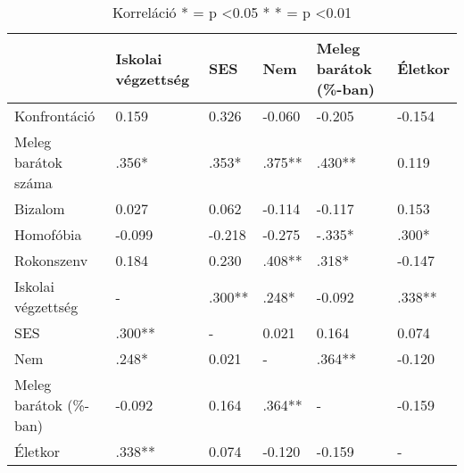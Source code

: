 \begin{table}[h]
	\begin{tabular}{@{}lp{2cm}p{2cm}lp{2cm}l@{}}
		\toprule
		& Iskolai végzettség & SES & Nem    & Meleg barátok (\%-ban) & Életkor \\ \midrule
		Konfrontáció            & 0.159              & 0.326                   & -0.060 & -0.205                 & -0.154  \\
		Meleg barátok száma     & .356*              & .353*                   & .375** & .430**                 & 0.119   \\
		Bizalom                 & 0.027              & 0.062                   & -0.114 & -0.117                 & 0.153   \\
		Homofóbia               & -0.099             & -0.218                  & -0.275 & -.335*                 & .300*   \\
		Rokonszenv              & 0.184              & 0.230                   & .408** & .318*                  & -0.147  \\
		Iskolai végzettség      & -                  & .300**                  & .248*  & -0.092                 & .338**  \\
		SES & .300**             & -                       & 0.021  & 0.164                  & 0.074   \\
		Nem                     & .248*              & 0.021                   & -      & .364**                 & -0.120  \\
		Meleg barátok (\%-ban)  & -0.092             & 0.164                   & .364** & -                      & -0.159  \\
		Életkor                 & .338**             & 0.074                   & -0.120 & -0.159                 & -       \\ \bottomrule
	\end{tabular}
	\caption{Korreláció \quad
		* = p \textless 0.05 * * = p \textless 0.01 }
	\label{table:3}
\end{table}

